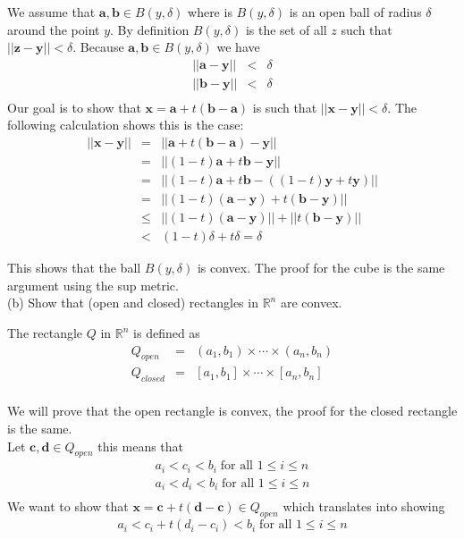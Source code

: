 \documentclass[11pt,reqno]{article}
\begin{document}
We assume that $\textbf{a},\textbf{b} \in B(y,\delta)$ where is $B(y,\delta)$ is an open ball of radius $\delta$ around the point $y$. By definition $B(y,\delta)$ is the set of all $z$ such that $|| \textbf{z} - \textbf{y}|| < \delta$. Because $\textbf{a},\textbf{b} \in B(y,\delta)$ we have 
\begin{eqnarray*}
|| \textbf{a} - \textbf{y} || &<& \delta \\
|| \textbf{b} - \textbf{y} || &<& \delta \\
\end{eqnarray*}
Our goal is to show that $\textbf{x} = \textbf{a} + t(\textbf{b} - \textbf{a})$ is such that $|| \textbf{x} - \textbf{y} || < \delta$. The following calculation shows this is the case:
\begin{eqnarray*}
|| \textbf{x} - \textbf{y} || &=& || \textbf{a} + t(\textbf{b} - \textbf{a}) - \textbf{y} || \\ 
				    &=& || (1-t)\textbf{a} + t\textbf{b} - \textbf{y} || \\
				    &=& || (1-t)\textbf{a} + t\textbf{b} - ((1 - t)\textbf{y} + t\textbf{y}) || \\ 
				    &=& || (1-t)(\textbf{a}-\textbf{y}) + t(\textbf{b} - \textbf{y})|| \\ 
				    &\le& || (1-t)(\textbf{a}-\textbf{y})|| + ||t(\textbf{b} - \textbf{y})||\\
				    &<& (1-t) \delta + t \delta = \delta
\end{eqnarray*}
 
\noindent This shows that the ball $B(y,\delta)$ is convex. The proof for the cube is the same argument using the sup metric.\\

\noindent (b) Show that (open and closed) rectangles in $\mathbb{R}^n$ are convex.

The rectangle $Q$ in $\mathbb{R}^n$ is defined as 
\begin{eqnarray*}
Q_{open} &=& (a_1,b_1) \times \cdots \times (a_n,b_n) \\
Q_{closed} &=& [a_1,b_1] \times \cdots \times [a_n,b_n] \\
\end{eqnarray*}

We will prove that the open rectangle is convex, the proof for the closed rectangle is the same.\\
Let $\textbf{c},\textbf{d} \in Q_{open}$ this means that 
\begin{eqnarray*}
&a_i < c_i < b_i \; \text{for all $1 \le i \le n$} & \\
&a_i < d_i < b_i \; \text{for all $1 \le i \le n$} & \\
\end{eqnarray*}
We want to show that $\textbf{x} = \textbf{c} + t(\textbf{d} - \textbf{c}) \in Q_{open}$ which translates into showing 
\[ a_i < c_i + t(d_i - c_i) < b_i \; \text{for all $1 \le i \le n$} \]
\end{document}
